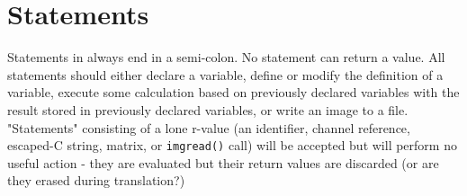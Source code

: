 \section{Statements}
\label{sec:statements}

Statements in \sys{} always end in a semi-colon. No statement
can return a value. All statements should either declare a variable,
define or modify the definition of a variable, execute
some calculation based on previously declared variables with
the result stored in previously declared variables, or write an image to a file.
"Statements" consisting of a lone r-value (an identifier,
channel reference, escaped-C string, matrix, or \texttt{imgread()} call)
will be accepted but will perform no useful action - they are evaluated but
their return values are discarded (or are they erased during translation?)
